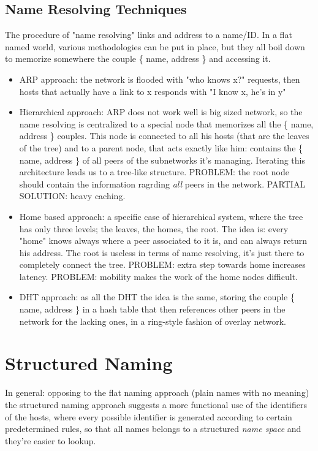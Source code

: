 \documentclass[10pt,a4paper]{article}
\begin{document}
			\subsection{Name Resolving Techniques}
				The procedure of "name resolving" links and address to a name/ID. In a flat named world, various methodologies can be put in place, but they all boil down to memorize somewhere the couple \{ name, address \} and accessing it.
				\begin{itemize}
					\item ARP approach: the network is flooded with "who knows x?" requests, then hosts that actually have a link to x responds with "I know x, he's in y"
					\item Hierarchical approach: ARP does not work well is big sized network, so the name resolving is centralized to a special node that memorizes all the \{ name, address \} couples. This node is connected to all his hosts (that are the leaves of the tree) and to a parent node, that acts exactly like him: contains the \{ name, address \} of all peers of the subnetworks it's managing. Iterating this architecture leads us to a tree-like structure. PROBLEM: the root node should contain the information ragrding \emph{all} peers in the network. PARTIAL SOLUTION: heavy caching. 
					\item Home based approach: a specific case of hierarchical system, where the tree has only three levels; the leaves, the homes, the root. The idea is: every "home" knows always where a peer associated to it is, and can always return his address. The root is useless in terms of name resolving, it's just there to completely connect the tree. PROBLEM: extra step towards home increases latency. PROBLEM: mobility makes the work of the home nodes difficult. 
					\item DHT approach: as all the DHT the idea is the same, storing the couple \{ name, address \} in a hash table that then references other peers in the network for the lacking ones, in a ring-style fashion of overlay network.
				\end{itemize}
		
		\section{Structured Naming}
			In general: opposing to the flat naming approach (plain names with no meaning) the structured naming approach suggests a more functional use of the identifiers of the hosts, where every possible identifier is generated according to certain predetermined rules, so that all names belongs to a structured \emph{name space} and they're easier to lookup.
			
\end{document}
